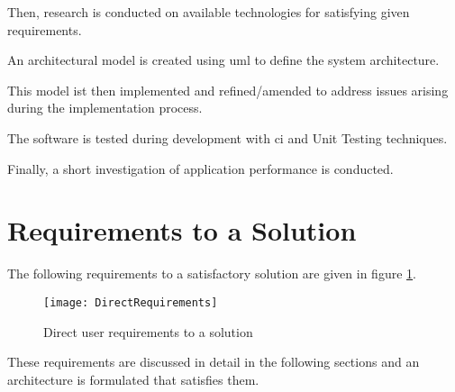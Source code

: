 Then, research is conducted on available technologies for satisfying given requirements.

An architectural model is created using \gls{uml} to define the system architecture.

This model ist then implemented and refined/amended to address issues arising during the implementation process.

The software is tested during development with \gls{ci} and \gls{Unit Testing} techniques.

Finally, a short investigation of application performance is conducted.

\section{Requirements to a Solution}
The following requirements to a satisfactory solution are given in figure \ref{img1}.

\begin{figure}[h]
	\texttt{[image: DirectRequirements]}
	\caption{Direct user requirements to a solution}
	\label{img1}
\end{figure}

These requirements are discussed in detail in the following sections and an architecture is formulated that satisfies them.
